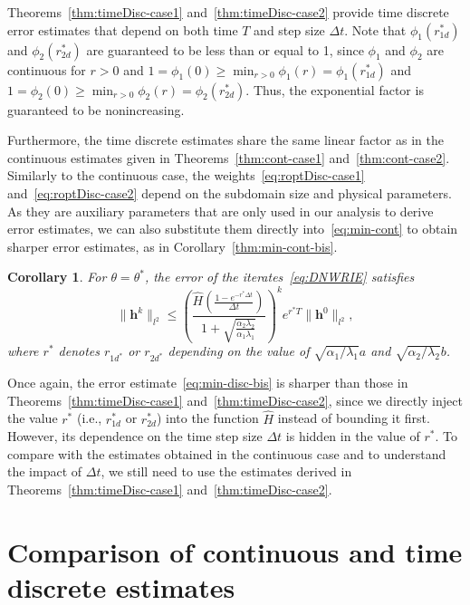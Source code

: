 \documentclass[10pt,a4paper]{amsart}
\newtheorem{corollary}{Corollary}
\begin{document}
Theorems~\ref{thm:timeDisc-case1} and~\ref{thm:timeDisc-case2} provide time discrete error estimates that depend on both time $T$ and step size $\Delta t$. Note that $\phi_1(r^*_{1d})$ and $\phi_2(r^*_{2d})$ are guaranteed to be less than or equal to 1, since $\phi_1$ and $\phi_2$ are continuous for $r>0$ and $1 =\phi_1(0) \geq \min_{r>0} \phi_1(r) = \phi_1(r^*_{1d})$ and $1 =\phi_2(0) \geq \min_{r>0} \phi_2(r) = \phi_2(r^*_{2d})$. Thus, the exponential factor is guaranteed to be nonincreasing. 

Furthermore, the time discrete estimates share the same linear factor as in the continuous estimates given in Theorems~\ref{thm:cont-case1} and~\ref{thm:cont-case2}. Similarly to the continuous case, the weights~\eqref{eq:roptDisc-case1} and~\eqref{eq:roptDisc-case2} depend on the subdomain size and physical parameters. As they are auxiliary parameters that are only used in our analysis to derive error estimates, we can also substitute them directly into~\eqref{eq:min-cont} to obtain sharper error estimates, as in Corollary~\ref{thm:min-cont-bis}.


\begin{corollary}\label{thm:min-disc-bis}
	For $\theta = \theta^*$, the error of the iterates~\eqref{eq:DNWRIE} satisfies
	\begin{equation}\label{eq:min-disc-bis}
			\|\boldsymbol h^k\|_{l^2} 
			\leq \left(\frac{\hat H \left(\frac{1-e^{-r^* \Delta t}}{\Delta t}\right)}{1+\sqrt{\frac{\alpha_2\lambda_2}{\alpha_1\lambda_1}}}\right)^ke^{r^*T} \|\boldsymbol{h}^0\|_{l^2},
	\end{equation} 
	where $r^*$ denotes $r_{1d^*}$ or $r_{2d^*}$ depending on the value of  $\sqrt{\alpha_1/\lambda_1} a$ and $\sqrt{\alpha_2/\lambda_2} b$.
\end{corollary}


Once again, the error estimate~\eqref{eq:min-disc-bis} is sharper than those in Theorems~\ref{thm:timeDisc-case1} and~\ref{thm:timeDisc-case2}, since we directly inject the value $r^*$ (i.e., $r_{1d}^*$ or $r_{2d}^*$) into the function $\hat H$ instead of bounding it first. However, its dependence on the time step size $\Delta t$ is hidden in the value of $r^*$. To compare with the estimates obtained in the continuous case and to understand the impact of $\Delta t$, we still need to use the estimates derived in Theorems~\ref{thm:timeDisc-case1} and~\ref{thm:timeDisc-case2}.
\section{Comparison of continuous and time discrete estimates}\label{sec:4}
\end{document}
